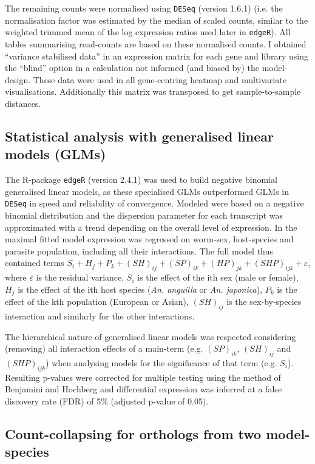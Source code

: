 The remaining counts were normalised using \texttt{DESeq} (version
1.6.1) (i.e.  the normalisation factor was estimated by the median of
scaled counts, similar to the weighted trimmed mean of the log
expression ratios used later in \texttt{edgeR}). All tables
summarising read-counts are based on these normalised counts. I
obtained ``variance stabilised data'' in an expression matrix for each
gene and library using the ``blind'' option in a calculation not
informed (and biased by) the model-design. These data were used in all
gene-centring heatmap and multivariate visualisations. Additionally this
matrix was transposed to get sample-to-sample distances.

\subsection{Statistical analysis with generalised linear models (GLMs)}

The R-package \texttt{edgeR} (version 2.4.1) \cite{pmid19910308} was
used to build negative binomial generalised linear models, as these
specialised GLMs outperformed GLMs in \texttt{DESeq} in speed and
reliability of convergence. Modeled were based on a negative binomial
distribution and the dispersion parameter for each transcript was
approximated with a trend depending on the overall level of
expression. In the maximal fitted model expression was regressed on
worm-sex, host-species and parasite population, including all their
interactions. The full model thus contained terms $ S_i + H_j + P_k +
(SH)_{ij} + (SP)_{ik} + (HP)_{jk} + (SHP)_{ijk} + \varepsilon$, where
$\varepsilon$ is the residual variance, $S_i$ is the effect of the ith
sex (male or female), $H_j$ is the effect of the ith host species
(\textit{An. anguilla} or \textit{An. japonica}), $P_k$ is the effect
of the kth population (European or Asian), $(SH)_{ij}$ is the
sex-by-species interaction and similarly for the other interactions.

The hierarchical nature of generalised linear models was respected
considering (removing) all interaction effects of a main-term
(e.g. $(SP)_{ik}$, $(SH)_{ij}$ and $(SHP)_{ijk}$) when analysing
models for the significance of that term (e.g. $S_i$). Resulting
p-values were corrected for multiple testing using the method of
Benjamini and Hochberg \cite{benjamini1995controlling} and
differential expression was inferred at a false discovery rate (FDR)
of 5\% (adjusted p-value of 0.05).

\subsection{Count-collapsing for orthologs from two model-species}
\label{collapse}

